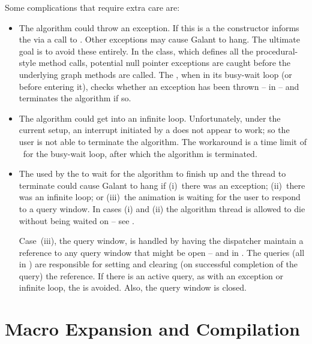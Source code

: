 Some complications that require extra care are:

\begin{itemize}

\item The algorithm could throw an exception. If this is a
   the constructor informs the
   via a call to
  .
  Other exceptions may cause Galant to hang. The ultimate goal is to avoid
  these entirely. In the  class, which defines all the
  procedural-style method calls, potential null pointer exceptions are
  caught before the underlying graph methods are called.
  The , when in its busy-wait loop (or before
  entering it), checks whether
  an exception has been thrown --  in
   -- and terminates the algorithm if so.

\item The algorithm could get into an infinite loop. Unfortunately, under the
  current setup, an interrupt initiated by a  does not
  appear to work; so the user is not able to terminate the algorithm. The
  workaround is a time limit of \Timeout\ for the busy-wait loop, after which
  the algorithm is terminated.

\item The  used by the  to wait for the
  algorithm to finish up and the thread to terminate could cause Galant to
  hang if (i)~there was an exception; (ii)~there was an infinite loop; or
  (iii)~the animation is waiting for the user to respond to a query window.
  In cases (i) and (ii) the algorithm thread is allowed to die without being
  waited on -- see .

  Case~(iii), the query window, is handled by having the dispatcher maintain
  a reference to any query window that might be open --
   and  in
  .
  The queries (all in ) are responsible for setting and
  clearing (on successful completion of the query) the reference.
  If there is an active query, as with an exception or infinite loop, the
   is avoided. Also, the query window is closed.
\end{itemize}

\section{Macro Expansion and Compilation} \label{sec:compilation}

